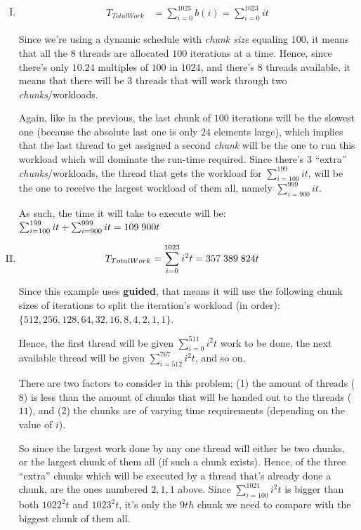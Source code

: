 \documentclass[fontsize=11pt, paper=a4, titlepage]{article}
\begin{document}
\begin{enumerate}[a)]
\begin{enumerate}[I)]
        \item\begin{align*}
            T_{TotalWork} &= \sum_{i=0}^{1023} b(i) = \sum_{i=0}^{1023} it
        \end{align*}

Since we're using a dynamic schedule with \textit{chunk size} equaling $100$, it
means that all the $8$ threads are allocated $100$ iterations at a time. Hence,
since there's only $10.24$ multiples of $100$ in $1024$, and there's $8$ threads
available, it means that there will be $3$ threads that will work through two
\textit{chunks}/workloads.

Again, like in the previous, the last chunk of $100$ iterations will be the
slowest one (because the absolute last one is only $24$ elements large), which
implies that the last thread to get assigned a second \textit{chunk} will be the
one to run this workload which will dominate the run-time required. Since
there's $3$ ``extra'' \textit{chunks}/workloads, the thread that gets the
workload for $\sum_{i=100}^199 it$, will be the one to receive the largest
workload of them all, namely $\sum_{i=900}^999 it$.

As such, the time it will take to execute will be:
$\sum_{i=100}^{199} it + \sum_{i=900}^{999} it = 109\thickspace 900t$

        \item\begin{align*}
            T_{TotalWork} &= \sum_{i=0}^{1023} i^2t =
            357\thickspace 389\thickspace 824t
        \end{align*}

Since this example uses \textbf{guided}, that means it will use the following
chunk sizes of iterations to split the iteration's workload (in order): $\{512,
256, 128, 64, 32, 16, 8, 4, 2, 1, 1\}$.

Hence, the first thread will be given $\sum_{i=0}^{511}i^2t$ work to be done,
the next available thread will be given $\sum_{i=512}^{767}i^2t$, and so on.

There are two factors to consider in this problem; (1) the amount of threads
($8$) is less than the amount of chunks that will be handed out to the threads
($11$), and (2) the chunks are of varying time requirements (depending on the
value of $i$).

So since the largest work done by any one thread will either be two chunks, or
the largest chunk of them all (if such a chunk exists). Hence, of the three
``extra'' chunks which will be executed by a thread that's already done a chunk,
are the ones numbered ${2, 1, 1}$ above. Since $\sum_{i=100}^{1021}i^2t$ is
bigger than both $1022^2t$ and $1023^2t$, it's only the $9th$ chunk we need to
compare with the biggest chunk of them all.


\end{enumerate}
\end{enumerate}
\end{document}
